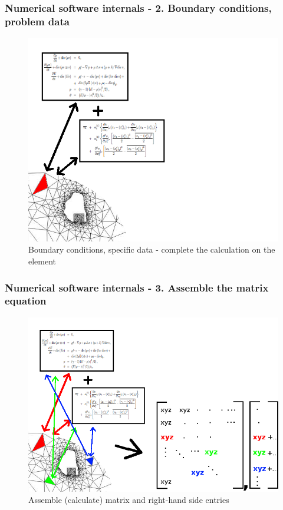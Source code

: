 \documentclass{beamer}
\begin{document}
\begin{frame}
\large
\frametitle{Numerical software internals - 2. Boundary conditions, problem data}
\begin{figure}[!ht]
\vspace{-1mm}
\begin{center}
\includegraphics[height=0.8\textheight]{internals4.png}
\caption{Boundary conditions, specific data - complete the calculation on the element}
\end{center}
\noindent
\vspace{-4mm}
\end{figure}
\end{frame}
\begin{frame}
\large
\frametitle{Numerical software internals - 3. Assemble the matrix equation}
\begin{figure}[!ht]
\vspace{-1mm}
\begin{center}
\includegraphics[height=0.8\textheight]{internals5.png}
\caption{Assemble (calculate) matrix and right-hand side entries}
\end{center}
\noindent
\vspace{-4mm}
\end{figure}
\end{frame}
\end{document}
